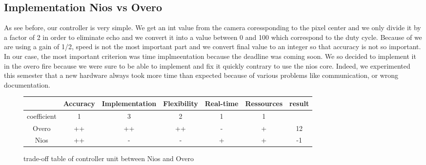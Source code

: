 \subsection{Implementation Nios vs Overo}

As see before, our controller is very simple. We get an int value from the camera coressponding to the pixel center and we only divide it by a factor of 2 in order to eliminate echo and we convert it into a value between 0 and 100 which correspond to the duty cycle. Because of we are using a gain of 1/2, speed is not the most important part and we convert final value to an integer so that accuracy is not so important. In our case, the most important criterion was time implmeentation because the deadline was coming soon. We so decided to implement it in the overo fire because we were sure to be able to implement and fix it quickly contrary to use the nios core. Indeed, we experimented this semester that a new hardware always took more time than expected because of various problems like communication, or wrong documentation.

\begin{figure}[!ht]
\hspace{-1cm}
\begin{tabular}{|c|c|c|c|c|c|c|}\hline
                         & Accuracy  & Implementation & Flexibility & Real-time & Ressources & result \\\hline
coefficient   &         1          &           3                      &         2           &           1         &           1            &              \\\hline
Overo            &      ++          &            ++                    &        ++           &        -         &           +           &    12        \\\hline
Nios               &      ++         &              -                &         -       &         +          &           +        &   -1 \\\hline
\end{tabular}
\caption{trade-off table of controller unit between Nios and Overo}
\end{figure}
